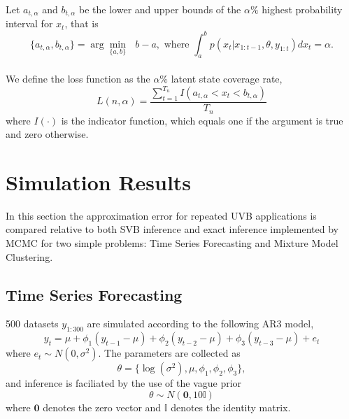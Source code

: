 \documentclass[12pt,a4paper]{article}\usepackage[]{graphicx}\usepackage[]{color}
\begin{document}
Let $a_{t, \alpha}$ and $b_{t, \alpha}$ be the lower and upper bounds of the $\alpha\%$ highest probability interval for $x_t$, that is
\begin{equation}
\label{HPI}
\{a_{t, \alpha}, b_{t, \alpha}\} = \arg \underset{\{a, b\}}{\min}\mbox{ } b - a, \mbox{ where } \int_a^b p(x_t | x_{1:t-1}, \theta, y_{1:t})dx_t = \alpha.
\end{equation}
\\

We define the loss function as the $\alpha\%$ latent state coverage rate, 
\begin{equation}
\label{coverage}
L(n, \alpha) = \frac{\sum_{t=1}^{T_n} I(a_{t, \alpha} < x_t < b_{t, \alpha})}{T_n}
\end{equation}
where $I(\cdot)$ is the indicator function, which equals one if the argument is true and zero otherwise.
\fi

\section{Simulation Results}
\label{sec:UVBSim}

In this section the approximation error for repeated UVB applications is compared relative to both SVB inference and exact inference implemented by MCMC for two simple problems: Time Series Forecasting and Mixture Model Clustering.

\subsection{Time Series Forecasting}
\label{subsec:UVBTS}

500 datasets $y_{1:300}$ are simulated according to the following AR3 model,
\begin{equation}
\label{UVB:TSAR3}
y_t = \mu + \phi_1 (y_{t-1} - \mu) + \phi_2 (y_{t-2} - \mu) + \phi_3 (y_{t-3} - \mu) + e_t
\end{equation}
where $e_t \sim N(0, \sigma^2)$. 
The parameters are collected as 
\begin{equation}
\label{UVB:TStheta}
\theta = \{\log(\sigma^2), \mu, \phi_1, \phi_2, \phi_3 \},
\end{equation}
and inference is faciliated by the use of the vague prior
\begin{equation}
\label{UVB:TSprior}
\theta \sim N(\boldsymbol{0}, 10 \mathbb{I})
\end{equation}
where $\boldsymbol{0}$ denotes the zero vector and $\mathbb{I}$ denotes the identity matrix.
\\
\end{document}
